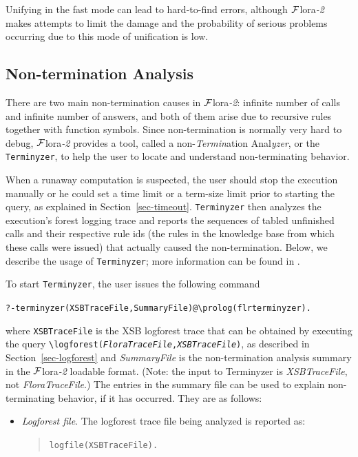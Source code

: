 \documentclass[11pt]{article}
\newcommand{\FLORA}{{\mbox{\sc ${\cal F}${lora}\rm\emph{-2}}}\xspace}
\newcommand{\FLSYSTEM}{\FLORA}
\newcommand{\bs}{\textbackslash}
\begin{document}
Unifying in the fast mode can lead to hard-to-find errors, although \FLSYSTEM
makes attempts to limit the damage and the probability of serious problems
occurring due to this mode of unification is low.


\ifdef{\isfloraman} {
\subsection{Non-termination Analysis}\label{sec-terminyzer}

There are two main non-termination causes in \FLSYSTEM: infinite number of
calls and infinite number of answers, and both of them arise due to
recursive rules together with function symbols. 
Since non-termination is normally very hard to debug, \FLSYSTEM provides 
a tool, called a
non-\emph{Termin}ation Anal\emph{yzer}, or the
\texttt{Terminyzer}, to help the user to locate and understand
non-terminating behavior. 

When a runaway computation is suspected, the user should stop the execution
manually or he could set a 
time limit or a term-size limit prior to starting the query, as explained
in Section~\ref{sec-timeout}.
\texttt{Terminyzer} then analyzes the execution's forest logging trace
and reports the sequences of tabled unfinished calls and their
respective rule ids (the rules in the knowledge base from which these
calls were issued) that actually caused the non-termination.
Below, we describe the usage of \texttt{Terminyzer}; more
information can be found in \cite{terminyzer2,liang-padl-13}.

To start \texttt{Terminyzer}, the user issues the following command
\begin{alltt}
    ?- terminyzer(XSBTraceFile,SummaryFile)@\bs{}prolog(flrterminyzer).
\end{alltt}
where {\tt XSBTraceFile} is the XSB logforest trace that can be
obtained by executing the query 
{\tt \bs{}logforest(\emph{FloraTraceFile},\emph{XSBTraceFile})}, as described in
Section~\ref{sec-logforest} and \emph{SummaryFile} is the non-termination
analysis summary in the \FLSYSTEM loadable format.  (Note: the input to
Terminyzer is \emph{XSBTraceFile}, not \emph{FloraTraceFile}.)   
The entries in the summary file can be used to explain non-terminating
behavior, if it has occurred. They are as follows:
\begin{itemize}
\item \emph{Logforest file}. The logforest trace file being analyzed
  is reported as:
  \begin{quote}
    {\tt logfile(XSBTraceFile).}
  \end{quote}


\end{itemize}}
\end{document}
